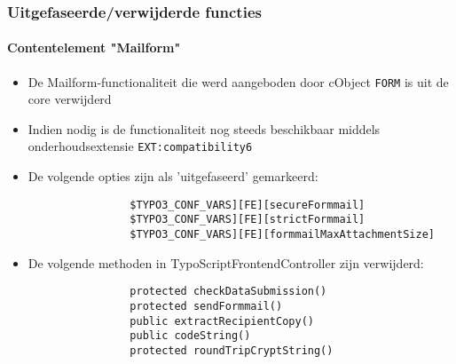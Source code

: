 
\begin{frame}[fragile]
	\frametitle{Uitgefaseerde/verwijderde functies}
	\framesubtitle{Contentelement "Mailform"}

	\begin{itemize}

		\item De Mailform-functionaliteit die werd aangeboden door cObject \texttt{FORM} is uit de core verwijderd
		
		\item Indien nodig is de functionaliteit nog steeds beschikbaar middels onderhoudsextensie \texttt{EXT:compatibility6}

		\item De volgende opties zijn als 'uitgefaseerd' gemarkeerd:

			\begin{lstlisting}
				$TYPO3_CONF_VARS][FE][secureFormmail]
				$TYPO3_CONF_VARS][FE][strictFormmail]
				$TYPO3_CONF_VARS][FE][formmailMaxAttachmentSize]
			\end{lstlisting}

		\item De volgende methoden in TypoScriptFrontendController zijn verwijderd:

			\begin{lstlisting}
				protected checkDataSubmission()
				protected sendFormmail()
				public extractRecipientCopy()
				public codeString()
				protected roundTripCryptString()
			\end{lstlisting}

	\end{itemize}

\end{frame}


